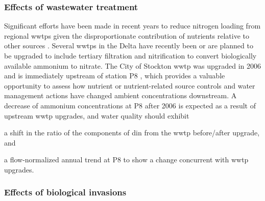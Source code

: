 \documentclass[letterpaper,12pt,oneside]{article}\usepackage[]{graphicx}\usepackage[]{color}
\begin{document}
\subsubsection{Effects of wastewater treatment}

Significant efforts have been made in recent years to reduce nitrogen loading from regional \acp{wwtp} given the disproportionate contribution of nutrients relative to other sources  \citep{Cornwell14,Novick15}.  Several \acp{wwtp} in the Delta have recently been or are planned to be upgraded to include tertiary filtration and nitrification to convert biologically available ammonium to nitrate. The City of Stockton \ac{wwtp} was upgraded in 2006 and is immediately upstream of station P8 \citep{Jabusch16}, which provides a valuable opportunity to assess how nutrient or nutrient-related source controls and water management actions have changed ambient concentrations downstream. A decrease of ammonium concentrations at P8 after 2006 is expected as a result of upstream \ac{wwtp} upgrades, and water quality should exhibit \begin{inparaenum}[1\upshape)]
\item a shift in the ratio of the components of \ac{din} from the \ac{wwtp} before/after upgrade, and
\item a flow-normalized annual trend at P8 to show a change concurrent with \ac{wwtp} upgrades.
\end{inparaenum}

\subsubsection{Effects of biological invasions}
\end{document}
